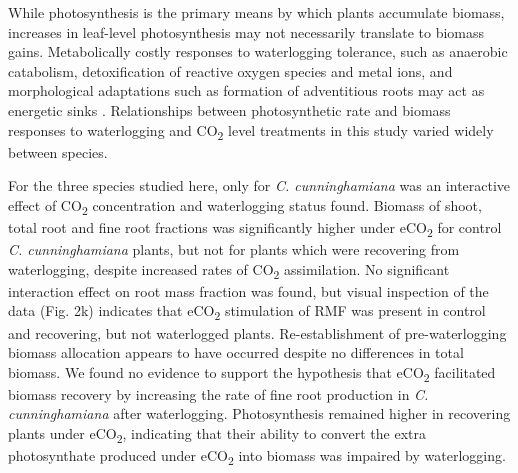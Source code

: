 \documentclass[12pt,a4paper]{memoir}
\begin{document}
While photosynthesis is the primary means by which plants accumulate biomass, increases in leaf-level photosynthesis may not necessarily translate to biomass gains. Metabolically costly responses to waterlogging tolerance, such as anaerobic catabolism, detoxification of reactive oxygen species and metal ions, and morphological adaptations such as formation of adventitious roots may act as energetic sinks \citep{Colmer2009}. Relationships between photosynthetic rate and biomass responses to waterlogging and CO\textsubscript{2} level treatments in this study varied widely between species.

For the three species studied here, only for \textit{C. cunninghamiana} was an interactive effect of CO\textsubscript{2} concentration and waterlogging status found. Biomass of shoot, total root and fine root fractions was significantly higher under eCO\textsubscript{2} for control \textit{C. cunninghamiana} plants, but not for plants which were recovering from waterlogging, despite increased rates of CO\textsubscript{2} assimilation. No significant interaction effect on root mass fraction was found, but visual inspection of the data (Fig. 2k) indicates that eCO\textsubscript{2} stimulation of RMF was present in control and recovering, but not waterlogged plants. Re-establishment of pre-waterlogging biomass allocation appears to have occurred despite no differences in total biomass. We found no evidence to support the hypothesis that eCO\textsubscript{2} facilitated biomass recovery by increasing the rate of fine root production in \textit{C. cunninghamiana} after waterlogging. Photosynthesis remained higher in recovering plants under eCO\textsubscript{2}, indicating that their ability to convert the extra photosynthate produced under eCO\textsubscript{2} into biomass was impaired by waterlogging. 
\end{document}
